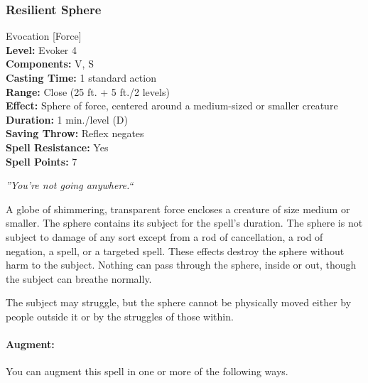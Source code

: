 \subsubsection{Resilient Sphere}
\label{Spell:ResilientSphere}
Evocation [Force]
\\ \textbf{Level:} Evoker 4
\\ \textbf{Components:} V, S
\\ \textbf{Casting Time:} 1 standard action
\\ \textbf{Range:} Close (25 ft. + 5 ft./2 levels)
\\ \textbf{Effect:} Sphere of force, centered around a medium-sized or smaller creature
\\ \textbf{Duration:} 1 min./level (D)
\\ \textbf{Saving Throw:} Reflex negates
\\ \textbf{Spell Resistance:} Yes
\\ \textbf{Spell Points:} 7

\emph{''You're not going anywhere.``}

A globe of shimmering, transparent force encloses a creature of size medium or smaller. 
The sphere contains its subject for the spell's duration. 
The sphere is not subject to damage of any sort except from a rod of cancellation, 
a rod of negation, a  spell, or a targeted  spell. 
These effects destroy the sphere without harm to the subject. 
Nothing can pass through the sphere, inside or out, though the subject can breathe normally.

The subject may struggle, but the sphere cannot be physically moved either by people outside it or by the struggles of those within.

\paragraph{Augment:} You can augment this spell in one or more of the following ways.

